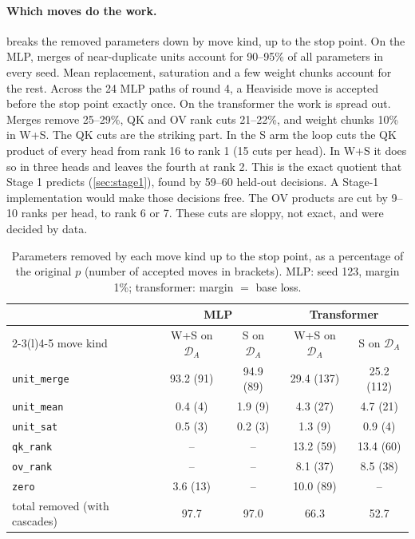 \documentclass[11pt,a4paper]{article}
\theoremstyle{definition}
\newcommand{\D}{\mathcal{D}}
\newcommand{\DA}{\D_{A}}
\newcommand{\code}[1]{\texttt{#1}}
\newcommand{\WS}{\textsf{W+S}}
\newcommand{\So}{\textsf{S}}
\begin{document}
\paragraph{Which moves do the work.}  breaks the removed parameters
down by move kind, up to the stop point. On the MLP, merges of near-duplicate units
account for 90--95\% of all parameters in every seed. Mean replacement, saturation and
a few weight chunks account for the rest. Across the 24 MLP paths of round 4, a
Heaviside move is accepted before the stop point exactly once. On the
transformer the work is spread out. Merges remove 25--29\%, QK and OV rank cuts 21--22\%,
and weight chunks 10\% in \WS. The QK cuts are the striking part. In the \So{} arm the
loop cuts the QK product of every head from rank 16 to rank 1 (15 cuts per head). In
\WS{} it does so in three heads and leaves the fourth at rank 2. This is the exact
quotient that Stage 1 predicts (\cref{sec:stage1}), found by 59--60 held-out decisions.
A Stage-1 implementation would make those decisions free. The OV products are cut by
9--10 ranks per head, to rank 6 or 7. These cuts are sloppy, not exact, and were
decided by data.

\begin{table}[t]
\centering\small
\caption{Parameters removed by each move kind up to the stop point, as a percentage of the
original $p$ (number of accepted moves in brackets). MLP: seed 123, margin 1\%;
transformer: margin $=$ base loss.}
\label{tab:composition}
\begin{tabular}{@{}lcccc@{}}
\toprule
& \multicolumn{2}{c}{MLP} & \multicolumn{2}{c}{Transformer}\\
\cmidrule(r){2-3}\cmidrule(l){4-5}
move kind & \WS{} on $\DA$ & \So{} on $\DA$ & \WS{} on $\DA$ & \So{} on $\DA$\\
\midrule
\code{unit\_merge} & 93.2 (91) & 94.9 (89) & 29.4 (137) & 25.2 (112)\\
\code{unit\_mean} & 0.4 (4) & 1.9 (9) & 4.3 (27) & 4.7 (21)\\
\code{unit\_sat} & 0.5 (3) & 0.2 (3) & 1.3 (9) & 0.9 (4)\\
\code{qk\_rank} & -- & -- & 13.2 (59) & 13.4 (60)\\
\code{ov\_rank} & -- & -- & 8.1 (37) & 8.5 (38)\\
\code{zero} & 3.6 (13) & -- & 10.0 (89) & --\\
\midrule
total removed (with cascades) & 97.7 & 97.0 & 66.3 & 52.7\\
\bottomrule
\end{tabular}
\end{table}
\end{document}

